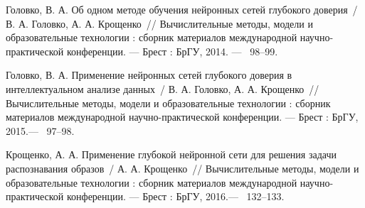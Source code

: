 Головко, В. А. Об одном методе обучения нейронных сетей глубокого доверия~/ В. А. Головко, А. А. Крощенко~// 
 Вычислительные методы, модели и образовательные технологии : сборник материалов международной научно-практической конференции. ---
\newblock Брест : БрГУ, 2014. ---
~98--99.

Головко, В. А.  Применение нейронных сетей глубокого доверия в интеллектуальном анализе данных~/ В. А. Головко, А. А. Крощенко~// 
 Вычислительные методы, модели и образовательные технологии : сборник материалов международной научно-практической конференции. ---
\newblock Брест : БрГУ, 2015.---
~97--98.

Крощенко, А. А. Применение глубокой нейронной сети для решения задачи распознавания образов~/ А. А. Крощенко~// 
 Вычислительные методы, модели и образовательные технологии : сборник материалов международной научно-практической конференции. ---
\newblock Брест : БрГУ, 2016.---
~132--133.




